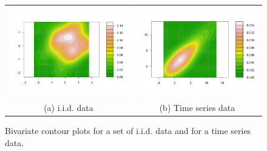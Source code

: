 \begin{figure}
\begin{center}
\begin{tabular}{cc}
\includegraphics[scale=0.25]{./figures/BivariateGaussian} &
\includegraphics[scale=0.25]{./figures/BivariateTimeSerie} \\
(a) i.i.d. data & (b)  Time series data \\
\end{tabular}
\caption{\label{Figure:PreliminariesBivariates}Bivariate contour plots for a set of i.i.d. data and for a time series data. 
}
\end{center}
\end{figure}


